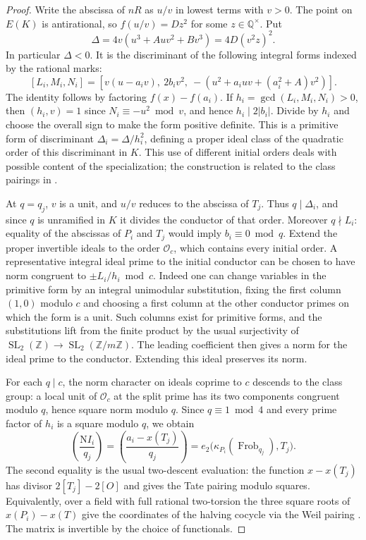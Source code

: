 \documentclass[11pt]{article}
\newcommand{\Q}{\mathbb Q}\newcommand{\Z}{\mathbb Z}\newcommand{\F}{\mathbb F}
\begin{document}
\begin{proof}
Write the abscissa of $nR$ as $u/v$ in lowest terms with $v>0$.
The point on $E(K)$ is antirational, so $f(u/v)=D z^2$ for some
$z\in\Q^\times$. Put
\[
 \Delta=4v(u^3+Auv^2+Bv^3)=4D(v^2z)^2 .
\]
In particular $\Delta<0$. It is the discriminant of the following
integral forms indexed by the rational marks:
\[
 [L_i,M_i,N_i]=
 [v(u-a_i v),\ 2b_i v^2,\
 -(u^2+a_iuv+(a_i^2+A)v^2)] .
\]
The identity follows by factoring $f(x)-f(a_i)$.
If $h_i=\gcd(L_i,M_i,N_i)>0$, then $(h_i,v)=1$ since
$N_i\equiv-u^2\bmod v$, and hence $h_i\mid2|b_i|$.
Divide by $h_i$ and choose the overall sign to make the form
positive definite. This is a primitive form of discriminant
$\Delta_i=\Delta/h_i^2$, defining a proper ideal class of the
quadratic order of this discriminant in $K$. This use of different
initial orders deals with possible content of the specialization;
the construction is related to the class pairings in \cite{GOT,Dall}.

At $q=q_j$, $v$ is a unit, and $u/v$ reduces to the abscissa of
$T_j$. Thus $q\mid\Delta_i$, and since $q$ is unramified in $K$
it divides the conductor of that order. Moreover $q\nmid L_i$:
equality of the abscissas of $P_i$ and $T_j$ would imply
$b_i\equiv0\bmod q$. Extend the proper invertible ideals to the order
$\mathcal O_c$, which contains every initial order.
A representative integral ideal prime to the initial conductor can
be chosen to have norm congruent to $\pm L_i/h_i\bmod c$. Indeed
one can change variables in the primitive form by an integral
unimodular substitution, fixing the first column $(1,0)$ modulo
$c$ and choosing a first column at the other conductor primes on
which the form is a unit. Such columns exist for primitive forms,
and the substitutions lift from the finite product by the usual
surjectivity of $\operatorname{SL}_2(\Z)\to
\operatorname{SL}_2(\Z/m\Z)$. The leading coefficient then gives a
norm for the ideal prime to the conductor. Extending this ideal
preserves its norm.

For each $q\mid c$, the norm character on ideals coprime to $c$
descends to the class group: a local unit of $\mathcal O_c$ at the
split prime has its two components congruent modulo $q$, hence
square norm modulo $q$. Since $q\equiv1\bmod4$ and every prime
factor of $h_i$ is a square modulo $q$, we obtain
\[
 \left(\frac{\mathrm N I_i}{q_j}\right)
 =\left(\frac{a_i-x(T_j)}{q_j}\right)
 =e_2\bigl(\kappa_{P_i}(\operatorname{Frob}_{q_j}),T_j\bigr).
\]
The second equality is the usual two-descent evaluation: the function
$x-x(T_j)$ has divisor $2[T_j]-2[O]$ and gives the Tate pairing
modulo squares. Equivalently, over a field with full rational
two-torsion the three square roots of $x(P_i)-x(T)$ give the
coordinates of the halving cocycle via the Weil pairing
\cite{half}. The matrix is invertible by the choice of functionals.
\end{proof}
\end{document}
